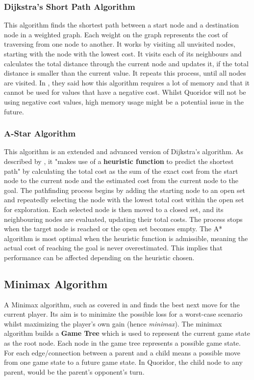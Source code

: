\documentclass[review]{cmpreport}
\begin{document}
\subsubsection{Dijkstra's Short Path Algorithm}
This algorithm finds the shortest path between a start node and a destination node in a weighted graph. Each weight on the graph represents the cost of traversing from one node to another. It works by visiting all unvisited nodes, starting with the node with the lowest cost. It visits each of its neighbours and calculates the total distance through the current node and updates it, if the total distance is smaller than the current value. It repeats this process, until all nodes are visited. In \cite{lawande2022systematic}, they said how this algorithm requires a lot of memory and that it cannot be used for values that have a negative cost. Whilst Quoridor will not be using negative cost values, high memory usage might be a potential issue in the future.

\subsubsection{A-Star Algorithm}
This algorithm is an extended and advanced version of Dijkstra's algorithm. As described by \cite{glendenning2005mastering}, it "makes use of a \textbf{heuristic function} to predict the shortest path" by calculating the total cost as the sum of the exact cost from the start node to the current node and the estimated cost from the current node to the goal. The pathfinding process begins by adding the starting node to an open set and repeatedly selecting the node with the lowest total cost within the open set for exploration. Each selected node is then moved to a closed set, and its neighbouring nodes are evaluated, updating their total costs. The process stops when the target node is reached or the open set becomes empty. The A* algorithm is most optimal when the heuristic function is admissible, meaning the actual cost of reaching the goal is never overestimated. This implies that performance can be affected depending on the heuristic chosen.

\subsection{Minimax Algorithm}
A Minimax algorithm, such as covered in \cite{plaat1996best} and \cite{strong2011minimax} finds the best next move for the current player. Its aim is to minimize the possible loss for a worst-case scenario whilst maximizing the player's own gain (hence \textit{minimax}). The minimax algorithm builds a \textbf{Game Tree} which is used to represent the current game state as the root node. Each node in the game tree represents a possible game state. For each edge/connection between a parent and a child means a possible move from one game state to a future game state. In Quoridor, the child node to any parent, would be the parent's opponent's turn.
\newline
\end{document}
